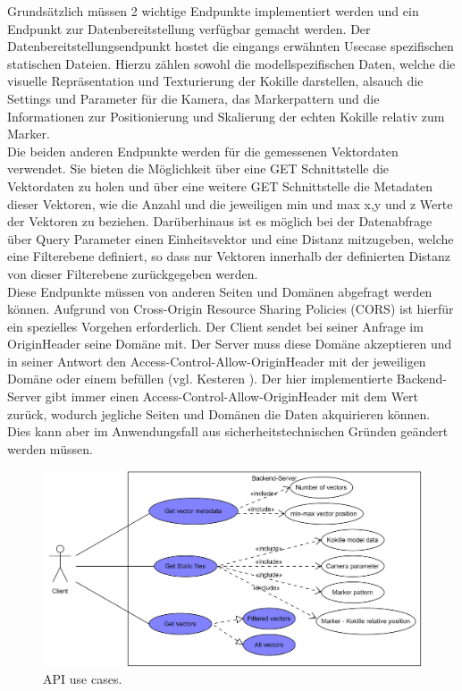 Grundsätzlich müssen 2 wichtige Endpunkte implementiert werden und ein Endpunkt zur Datenbereitstellung verfügbar gemacht werden.
Der Datenbereitstellungsendpunkt hostet die eingangs erwähnten Usecase spezifischen statischen Dateien. Hierzu zählen sowohl die modellspezifischen Daten, welche die visuelle Repräsentation und Texturierung der Kokille darstellen, alsauch die Settings und Parameter für die Kamera, das Markerpattern und die Informationen zur Positionierung und Skalierung der echten Kokille relativ zum Marker.\\
Die beiden anderen Endpunkte werden für die gemessenen Vektordaten verwendet. Sie bieten die Möglichkeit über eine GET Schnittstelle die Vektordaten zu holen und über eine weitere GET Schnittstelle die Metadaten dieser Vektoren, wie die Anzahl und die jeweiligen min und max x,y und z Werte der Vektoren zu beziehen. Darüberhinaus ist es möglich bei der Datenabfrage über Query Parameter einen Einheitsvektor und eine Distanz mitzugeben, welche eine Filterebene definiert, so dass nur Vektoren innerhalb der definierten Distanz von dieser Filterebene zurückgegeben werden.\\
Diese Endpunkte müssen von anderen Seiten und Domänen abgefragt werden können. Aufgrund von Cross-Origin Resource Sharing Policies (CORS) ist hierfür ein spezielles Vorgehen erforderlich. Der Client sendet bei seiner Anfrage im \grqq Origin\grqq\space Header seine Domäne mit. Der Server muss diese Domäne akzeptieren und in seiner Antwort den \grqq Access-Control-Allow-Origin\grqq\space Header mit der jeweiligen Domäne oder einem \grqq *\grqq\space befüllen (vgl. Kesteren \cite{van2014cross}). Der hier implementierte Backend-Server gibt immer einen \grqq Access-Control-Allow-Origin\grqq\space Header mit dem Wert \grqq *\grqq\space zurück, wodurch jegliche Seiten und Domänen die Daten akquirieren können. Dies kann aber im Anwendungsfall aus sicherheitstechnischen Gründen geändert werden müssen.

\begin{figure}
	\centering
	\includegraphics[width=1\linewidth]{images/backend/APIUseCases}
	\caption{API use cases.}
	\label{fig:backendUseCase}
\end{figure}


